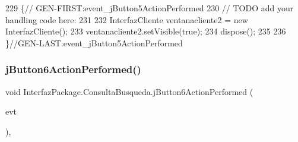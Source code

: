 \begin{DoxyCode}
229                                                                          \{\textcolor{comment}{//
      GEN-FIRST:event\_jButton5ActionPerformed}
230         \textcolor{comment}{// TODO add your handling code here:}
231         
232         InterfazCliente ventanacliente2 = \textcolor{keyword}{new} InterfazCliente();
233         ventanacliente2.setVisible(\textcolor{keyword}{true});
234         dispose();
235         
236     \}\textcolor{comment}{//GEN-LAST:event\_jButton5ActionPerformed}
\end{DoxyCode}
\mbox{\label{class_interfaz_package_1_1_consulta_busqueda_a2aa00c4b05ad23e9de48255e16c2ec5b}} 
\subsubsection{\texorpdfstring{j\+Button6\+Action\+Performed()}{jButton6ActionPerformed()}}
{\footnotesize\ttfamily void Interfaz\+Package.\+Consulta\+Busqueda.\+j\+Button6\+Action\+Performed (\begin{DoxyParamCaption}\item[{java.\+awt.\+event.\+Action\+Event}]{evt }\end{DoxyParamCaption})\hspace{0.3cm}{\ttfamily [inline]}, {\ttfamily [private]}}


